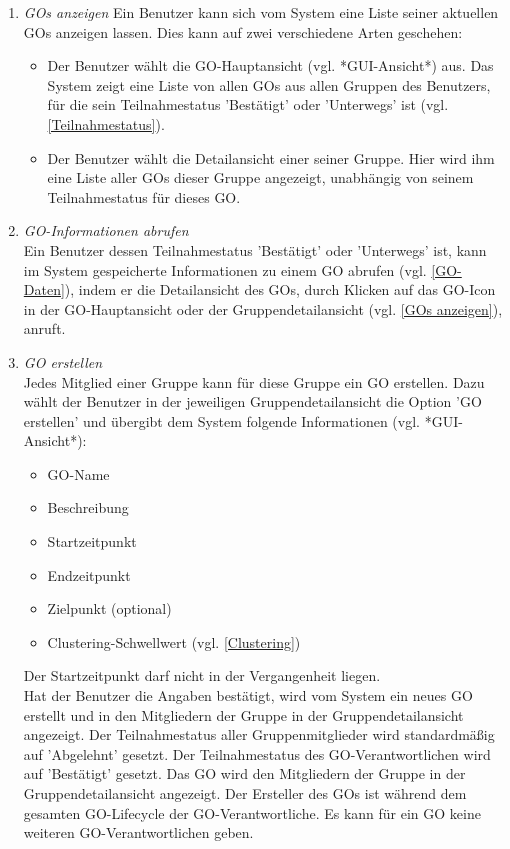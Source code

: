 \documentclass[parskip=full]{scrartcl}
\def\threedigits#1{%
  \ifnum#1<100 0\fi
  \ifnum#1<10 0\fi
  \number#1}
\begin{document}
\begin{enumerate}[label={\textbf{/F\protect\threedigits{\theenumi}0/}}, leftmargin=*, resume]	

	\item \textit{GOs anzeigen}\label{GOs anzeigen} Ein Benutzer kann sich vom System eine Liste seiner aktuellen GOs anzeigen lassen. Dies kann auf zwei verschiedene Arten geschehen:
	\begin{itemize}
		\item Der Benutzer wählt die GO-Hauptansicht (vgl. *GUI-Ansicht*) aus. Das System zeigt eine Liste von allen GOs aus allen Gruppen des Benutzers, für die sein Teilnahmestatus 'Bestätigt' oder 'Unterwegs' ist (vgl. \ref{Teilnahmestatus}).
		\item Der Benutzer wählt die Detailansicht einer seiner Gruppe. Hier wird ihm eine Liste aller GOs dieser Gruppe angezeigt, unabhängig von seinem Teilnahmestatus für dieses GO.
	\end{itemize}
	
	\item \textit{GO-Informationen abrufen}\label{GO-Informationen abrufen} \\
	Ein Benutzer dessen Teilnahmestatus 'Bestätigt' oder 'Unterwegs' ist, kann im System gespeicherte Informationen zu einem GO abrufen (vgl. \ref{GO-Daten}), indem er die Detailansicht des GOs, durch Klicken auf das GO-Icon in der GO-Hauptansicht oder der Gruppendetailansicht (vgl. \ref{GOs anzeigen}), anruft.

	\item \textit{GO erstellen}\label{GO erstellen} \\
	Jedes Mitglied einer Gruppe kann für diese Gruppe ein GO erstellen. Dazu wählt der Benutzer in der jeweiligen Gruppendetailansicht die Option 'GO erstellen' und übergibt dem System folgende Informationen (vgl. *GUI-Ansicht*):
	\begin{itemize}
		\item GO-Name
		\item \colorbox{shadecolor}{Beschreibung}
		\item Startzeitpunkt
		\item Endzeitpunkt 
		\item Zielpunkt (optional)
		\item \colorbox{shadecolor}{Clustering-Schwellwert (vgl. \ref{Clustering})}
	\end{itemize}
Der Startzeitpunkt darf nicht in der Vergangenheit liegen.\\
Hat der Benutzer die Angaben bestätigt, wird vom System ein neues GO erstellt und in den Mitgliedern der Gruppe in der Gruppendetailansicht angezeigt. Der Teilnahmestatus aller Gruppenmitglieder wird standardmäßig auf 'Abgelehnt' gesetzt. Der Teilnahmestatus des GO-Verantwortlichen wird auf 'Bestätigt' gesetzt.
Das GO wird den Mitgliedern der Gruppe in der Gruppendetailansicht angezeigt.
Der Ersteller des GOs ist während dem gesamten GO-Lifecycle der GO-Verantwortliche. Es kann für ein GO keine weiteren GO-Verantwortlichen geben.
	

\end{enumerate}
\end{document}

